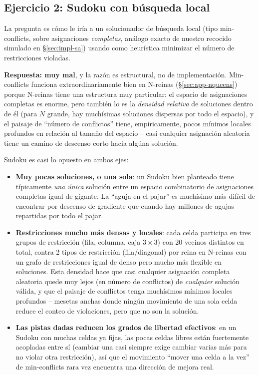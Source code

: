 \documentclass[11pt,onecolumn,letterpaper]{article}
\begin{document}
\subsection{Ejercicio 2: Sudoku con b\'usqueda local}
\label{sec:ex2}

La pregunta es c\'omo le ir\'ia a un solucionador de b\'usqueda local (tipo min-conflicts,
sobre asignaciones \emph{completas}, an\'alogo exacto de nuestro recocido simulado en
\S\ref{sec:impl-sa}) usando como heur\'istica minimizar el n\'umero de restricciones
violadas.

\textbf{Respuesta: muy mal}, y la raz\'on es estructural, no de implementaci\'on. Min-conflicts
funciona extraordinariamente bien en N-reinas (\S\ref{sec:app-nqueens}) porque N-reinas
tiene una estructura muy particular: el espacio de asignaciones completas es enorme, pero
tambi\'en lo es la \emph{densidad relativa} de soluciones dentro de \'el (para $N$ grande,
hay much\'isimas soluciones dispersas por todo el espacio), y el paisaje de ``n\'umero de
conflictos'' tiene, emp\'iricamente, pocos m\'inimos locales profundos en relaci\'on al
tama\~no del espacio -- casi cualquier asignaci\'on aleatoria tiene un camino de descenso
corto hacia alg\'una soluci\'on.

Sudoku es casi lo opuesto en ambos ejes:
\begin{itemize}[leftmargin=1.4em]
\item \textbf{Muy pocas soluciones, o una sola}: un Sudoku bien planteado tiene
  t\'ipicamente \emph{una \'unica} soluci\'on entre un espacio combinatorio de asignaciones
  completas igual de gigante. La ``aguja en el pajar'' es much\'isimo m\'as dif\'icil de
  encontrar por descenso de gradiente que cuando hay millones de agujas repartidas por
  todo el pajar.
\item \textbf{Restricciones mucho m\'as densas y locales}: cada celda participa en tres
  grupos de restricci\'on (fila, columna, caja $3\times3$) con 20 vecinos distintos en
  total, contra 2 tipos de restricci\'on (fila/diagonal) por reina en N-reinas con un
  grafo de restricciones igual de denso pero mucho m\'as flexible en soluciones. Esta
  densidad hace que casi cualquier asignaci\'on completa aleatoria quede muy lejos (en
  n\'umero de conflictos) de \emph{cualquier} soluci\'on v\'alida, y que el paisaje de
  conflictos tenga much\'isimos m\'inimos locales profundos -- mesetas anchas donde ning\'un
  movimiento de una sola celda reduce el conteo de violaciones, pero que no son la
  soluci\'on.
\item \textbf{Las pistas dadas reducen los grados de libertad efectivos}: en un Sudoku con
  muchas celdas ya fijas, las pocas celdas libres est\'an fuertemente acopladas entre s\'i
  (cambiar una casi siempre exige cambiar varias m\'as para no violar otra restricci\'on),
  as\'i que el movimiento ``mover una celda a la vez'' de min-conflicts rara vez encuentra
  una direcci\'on de mejora real.
\end{itemize}
\end{document}

